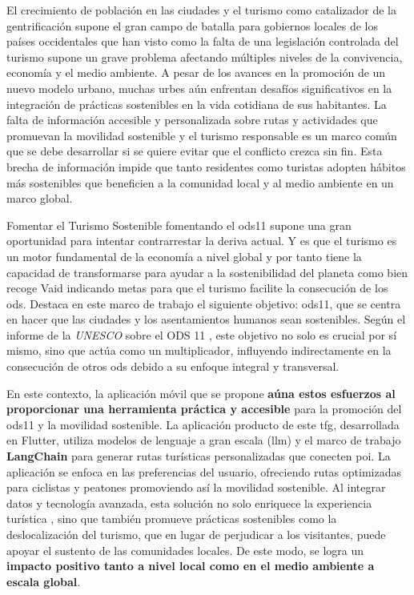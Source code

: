 
El crecimiento de población en las ciudades \cite{nieuwenhuijsen_urban_2020} y el turismo como catalizador de la gentrificación supone el gran campo de batalla para gobiernos locales de los países occidentales que han visto como la falta de una legislación controlada del turismo supone un grave problema afectando múltiples niveles de la convivencia, economía y el medio ambiente. A pesar de los avances en la promoción de un nuevo modelo urbano, muchas urbes aún enfrentan desafíos significativos en la integración de prácticas sostenibles en la vida cotidiana de sus habitantes. La falta de información accesible y personalizada sobre rutas y actividades que promuevan la movilidad sostenible y el turismo responsable es un marco común que se debe desarrollar si se quiere evitar que el conflicto crezca sin fin. Esta brecha de información impide que tanto residentes como turistas adopten hábitos más sostenibles que beneficien a la comunidad local y al medio ambiente en un marco global.

Fomentar el Turismo Sostenible fomentando el \acrshort{ods11} supone una gran oportunidad para intentar contrarrestar la deriva actual. Y es que el turismo es un motor fundamental de la economía a nivel global y por tanto tiene la capacidad de transformarse para ayudar a la sostenibilidad del planeta como bien recoge Vaid \cite{vaid_sustainable_2024-1} indicando metas para que el turismo facilite la consecución de los \acrfull{ods}. Destaca en este marco de trabajo el siguiente objetivo: \acrfull{ods11}, que se centra en hacer que las ciudades y los asentamientos humanos sean sostenibles. Según el informe de la \textit{UNESCO} sobre el ODS 11 \cite{ionescu_progress_2024}, este objetivo no solo es crucial por sí mismo, sino que actúa como un multiplicador, influyendo indirectamente en la consecución de otros \acrshort{ods} debido a su enfoque integral y transversal.

En este contexto, la aplicación móvil que se propone \textbf{aúna estos esfuerzos al proporcionar una herramienta práctica y accesible} para la promoción del \acrshort{ods11} y la movilidad sostenible. La aplicación producto de este \acrshort{tfg}, desarrollada en Flutter, utiliza modelos de lenguaje a gran escala (\acrfull{llm}) y el marco de trabajo \textbf{LangChain} para generar rutas turísticas personalizadas que conecten \acrfull{poi}. La aplicación se enfoca en las preferencias del usuario, ofreciendo rutas optimizadas para ciclistas y peatones promoviendo así la movilidad sostenible. Al integrar datos y tecnología avanzada, esta solución no solo enriquece la experiencia turística \cite{mitas_tell_2023}, sino que también promueve prácticas sostenibles como la deslocalización del turismo, que en lugar de perjudicar a los visitantes, puede apoyar el sustento de las comunidades locales. De este modo, se logra un \textbf{impacto positivo tanto a nivel local como en el medio ambiente a escala global}.